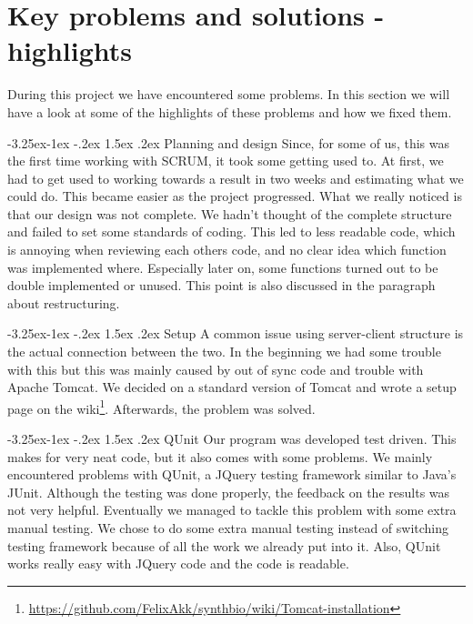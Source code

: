\documentclass[a4paper]{article}
\makeatletter
\renewcommand\paragraph{\@startsection{paragraph}{4}{\z@}%
  {-3.25ex\@plus -1ex \@minus -.2ex}%
  {1.5ex \@plus .2ex}%
  {\normalfont\normalsize\bfseries}}
\makeatother
\begin{document}
\section{Key problems and solutions - highlights}
\label{problems-solutions-highlights}

During this project we have encountered some problems. In this section we will have a look at some of the highlights of these problems and how we fixed them.

\paragraph{Planning and design}
Since, for some of us, this was the first time working with SCRUM, it took some getting used to. At first, we had to get used to working towards a result in two weeks and estimating what we could do. This became easier as the project progressed. 
What we really noticed is that our design was not complete. We hadn't thought of the complete structure and failed to set some standards of coding. This led to less readable code, which is annoying when reviewing each others code, and no clear idea which function was implemented where. Especially later on, some functions turned out to be double implemented or unused. This point is also discussed in the paragraph about restructuring.

\paragraph{Setup}
A common issue using server-client structure is the actual connection between the two. In the beginning we had some trouble with this but this was mainly caused by out of sync code and trouble with Apache Tomcat. We decided on a standard version of Tomcat and wrote a setup page on the wiki\footnote{\url{https://github.com/FelixAkk/synthbio/wiki/Tomcat-installation}}. Afterwards, the problem was solved.

\paragraph{QUnit}
Our program was developed test driven. This makes for very neat code, but it also comes with some problems. We mainly encountered problems with QUnit, a JQuery testing framework similar to Java's JUnit. Although the testing was done properly, the feedback on the results was not very helpful. Eventually we managed to tackle this problem with some extra manual testing. We chose to do some extra manual testing instead of switching testing framework because of all the work we already put into it. Also, QUnit works really easy with JQuery code and the code is readable. 
\end{document}
